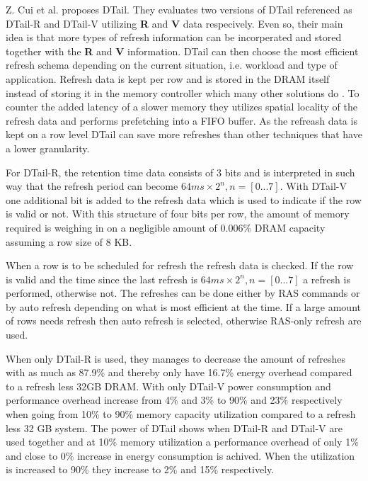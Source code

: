 Z. Cui et al. \cite{dtail} proposes DTail. They evaluates two versions of DTail referenced as DTail-R and DTail-V utilizing \textbf{R} and \textbf{V} data respecively. Even so, their main idea is that more types of refresh information can be incorperated and stored together with the \textbf{R} and \textbf{V} information. DTail can then choose the most efficient refresh schema depending on the current situation, i.e. workload and type of application. Refresh data is kept per row and is stored in the DRAM itself instead of storing it in the memory controller which many other solutions do \cite{raidr}\cite{smartrefresh}\cite{refrint}. To counter the added latency of a slower memory they utilizes spatial locality of the refresh data and performs prefetching into a FIFO buffer. As the refreash data is kept on a row level DTail can save more refreshes than other techniques that have a lower granularity.

For DTail-R, the retention time data consists of 3 bits and is interpreted in such way that the refresh period can become \(64ms \times 2^n, n = [0...7]\). With DTail-V one additional bit is added to the refresh data which is used to indicate if the row is valid or not. With this structure of four bits per row, the amount of memory required is weighing in on a negligible amount of 0.006\% DRAM capacity assuming a row size of 8 KB. 

When a row is to be scheduled for refresh the refresh data is checked. If the row is valid and the time since the last refresh is \(64ms \times 2^n, n = [0...7]\) a refresh is performed, otherwise not. The refreshes can be done either by RAS commands or by auto refresh depending on what is most efficient at the time. If a large amount of rows needs refresh then auto refresh is selected, otherwise RAS-only refresh are used. 

When only DTail-R is used, they manages to decrease the amount of refreshes with as much as 87.9\% and thereby only have 16.7\% energy overhead compared to a refresh less 32GB DRAM. With only DTail-V power consumption and performance overhead increase from 4\% and 3\% to 90\% and 23\% respectively when going from 10\% to 90\% memory capacity utilization compared to a refresh less 32 GB system. The power of DTail shows when DTail-R and DTail-V are used together and at 10\% memory utilization a performance overhead of only 1\% and close to 0\% increase in energy consumption is achived. When the utilization is increased to 90\% they increase to 2\% and 15\% respectively.
%

